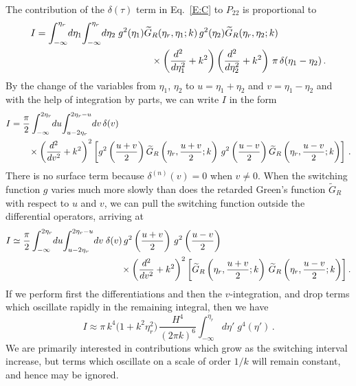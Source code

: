\documentclass[preprint,prd,showpacs,superscriptaddress]{revtex4}
\begin{document}
The contribution of the $\delta(\tau)$ term in Eq.~\eqref{E:C} to $P_{22}$ is proportional to
\begin{align}
	I&=\int_{-\infty}^{\eta_{r}}\!d\eta_{1}\!\int_{-\infty}^{\eta_{r}}\!d\eta_{2}\;g^{2}(\eta_{1})
	\widetilde{G}_{R}(\eta_r,\eta_{1};{k})\,g^{2}(\eta_{2})\widetilde{G}_{R}(\eta_r,\eta_{2};{k})\notag\\
	&\qquad\qquad\qquad\qquad\qquad\qquad\times\left(\frac{d^{2}}{d\eta_{1}^{2}}+k^{2}\right)
	\left(\frac{d^{2}}{d\eta_{2}^{2}}+k^{2}\right)\,\pi\,\delta(\eta_{1}-\eta_{2})\,.\label{E:I}
\end{align}
By the change of the variables from $\eta_{1}$, $\eta_{2}$ to $u=\eta_{1}+\eta_{2}$ and $v=\eta_{1}-\eta_{2}$ and with 
the help of integration by parts, we can write $I$ in the form
\begin{align}
	I&=\frac{\pi}{2}\int^{2\eta_{r}}_{-\infty}\!du\!\int_{u-2\eta_{r}}^{2\eta_{r}-u}\!dv\,\delta(v)\\
	&\qquad\times\left(\frac{d^{2}}{dv^{2}}+k^{2}\right)^{2}\biggl[g^{2}\left(\frac{u+v}{2}\right)
	\widetilde{G}_{R}\left(\eta_{r},\frac{u+v}{2};{k}\right)\,g^{2}\left(\frac{u-v}{2}\right)
	\widetilde{G}_{R}\left(\eta_{r},\frac{u-v}{2};{k}\right)\biggr]\,\,.\notag
\end{align}
There is no surface term because $\delta^{(n)}(v)=0$ when $v\neq0$. 
When the switching function $g$ varies much more slowly than does the retarded Green's function $\widetilde{G}_{R}$  
with respect to $u$ and $v$, we can pull the switching function outside the differential operators, arriving at
\begin{align}\label{E:I2}
	I&\simeq\frac{\pi}{2}\int^{2\eta_{r}}_{-\infty}\!du\!\int_{u-2\eta_{r}}^{2\eta_{r}-u}\!dv\;\delta(v)\,g^{2}\left(\frac{u+v}{2}\right)\,
	g^{2}\left(\frac{u-v}{2}\right)   \\
	&\qquad\qquad\qquad\qquad\qquad\qquad\times\left(\frac{d^{2}}{dv^{2}}+k^{2}\right)^{2}\biggl[\widetilde{G}_{R}\left(\eta_{r},
	\frac{u+v}{2};{k}\right)\,\widetilde{G}_{R}\left(\eta_{r},\frac{u-v}{2};{k}\right)\biggr]\,.\notag
\end{align}
If we perform first the differentiations and then the $v$-integration, and drop terms which oscillate rapidly in the remaining
integral, then we have
\begin{equation}
I \approx \pi\,k^{4}\bigl(1+k^{2}\eta^{2}_{r}\bigr)\,\frac{H^{4}}{(2\pi k)^{6}}\int_{-\infty}^{\eta_{r}}\!d\eta'\;g^{4}(\eta')\,.
\label{E:I3}
\end{equation}
We are primarily interested in contributions which grow as the switching interval increase, but terms which oscillate on a scale of order
$1/k$ will remain constant, and hence may be ignored.
\end{document}

